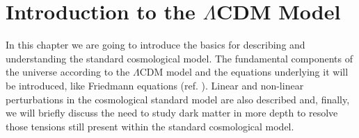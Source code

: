 \chapter{Introduction to the $\Lambda$CDM Model} \label{Capitolo 1}

In this chapter we are going to introduce the basics for describing and understanding the standard cosmological model. The fundamental components of the universe according to the $\Lambda$CDM model and the equations underlying it will be introduced, like Friedmann equations (ref. \cite{Friedmann-1922}). Linear and non-linear perturbations in the cosmological standard model are also described and, finally, we will briefly discuss the need to study dark matter in more depth to resolve those tensions still present within the standard cosmological model.

